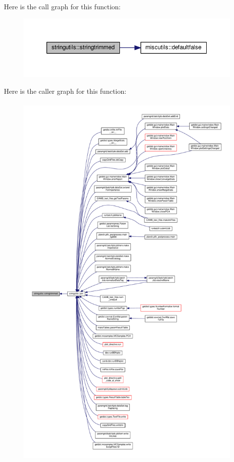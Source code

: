 Here is the call graph for this function\+:
\nopagebreak
\begin{figure}[H]
\begin{center}
\leavevmode
\includegraphics[width=350pt]{namespacestringutils_ac5e67eb0a4de77625ac1447804e1f934_cgraph}
\end{center}
\end{figure}
Here is the caller graph for this function\+:
\nopagebreak
\begin{figure}[H]
\begin{center}
\leavevmode
\includegraphics[height=550pt]{namespacestringutils_ac5e67eb0a4de77625ac1447804e1f934_icgraph}
\end{center}
\end{figure}
\mbox{\label{namespacestringutils_af51a1a8adbae76da62979f25232bd8df}} 
